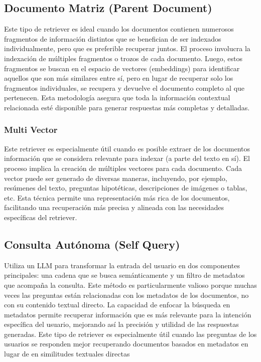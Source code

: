 \subsection{Documento Matriz (Parent Document)}

Este tipo de retriever es ideal cuando los documentos contienen numerosos fragmentos de información distintos que se benefician de ser indexados individualmente, pero que es preferible recuperar juntos. El proceso involucra la indexación de múltiples fragmentos o trozos de cada documento. Luego, estos fragmentos se buscan en el espacio de vectores (embeddings) para identificar aquellos que son más similares entre sí, pero en lugar de recuperar solo los fragmentos individuales, se recupera y devuelve el documento completo al que pertenecen. Esta metodología asegura que toda la información contextual relacionada esté disponible para generar respuestas más completas y detalladas.

\subsubsection{Multi Vector}

Este retriever es especialmente útil cuando es posible extraer de los documentos información que se considera relevante para indexar (a parte del texto en sí). El proceso implica la creación de múltiples vectores para cada documento. Cada vector puede ser generado de diversas maneras, incluyendo, por ejemplo, resúmenes del texto, preguntas hipotéticas, descripciones de imágenes o tablas, etc. 
Esta técnica permite una representación más rica de los documentos, facilitando una recuperación más precisa y alineada con las necesidades específicas del retriever.


\subsection{Consulta Autónoma (Self Query)}

Utiliza un LLM para transformar la entrada del usuario en dos componentes principales: una cadena que se busca semánticamente y un filtro de metadatos que acompaña la consulta. Este método es particularmente valioso porque muchas veces las preguntas están relacionadas con los metadatos de los documentos, no con su contenido textual directo. La capacidad de enfocar la búsqueda en metadatos permite recuperar información que es más relevante para la intención específica del usuario, mejorando así la precisión y utilidad de las respuestas generadas. Este tipo de retriever es especialmente útil cuando las preguntas de los usuarios se responden mejor recuperando documentos basados en metadatos en lugar de en similitudes textuales directas

